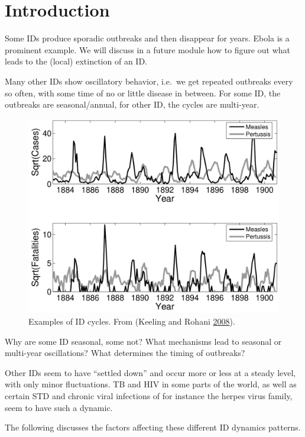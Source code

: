 \documentclass[]{book}
\theoremstyle{definition}
\theoremstyle{definition}
\theoremstyle{definition}
\theoremstyle{remark}
\begin{document}
\section{Introduction}\label{introduction-2}

Some IDs produce sporadic outbreaks and then disappear for years. Ebola
is a prominent example. We will discuss in a future module how to figure
out what leads to the (local) extinction of an ID.

Many other IDs show oscillatory behavior, i.e.~we get repeated outbreaks
every so often, with some time of no or little disease in between. For
some ID, the outbreaks are seasonal/annual, for other ID, the cycles are
multi-year.

\begin{figure}
\centering
\includegraphics{./images/IDcycles.pdf}
\caption{\label{fig:IDcycles}Examples of ID cycles. From (Keeling and Rohani
\protect\hyperlink{ref-keeling08}{2008}).}
\end{figure}

Why are some ID seasonal, some not? What mechanisms lead to seasonal or
multi-year oscillations? What determines the timing of outbreaks?

Other IDs seem to have ``settled down'' and occur more or less at a
steady level, with only minor fluctuations. TB and HIV in some parts of
the world, as well as certain STD and chronic viral infections of for
instance the herpes virus family, seem to have such a dynamic.

The following discusses the factors affecting these different ID
dynamics patterns.
\end{document}
